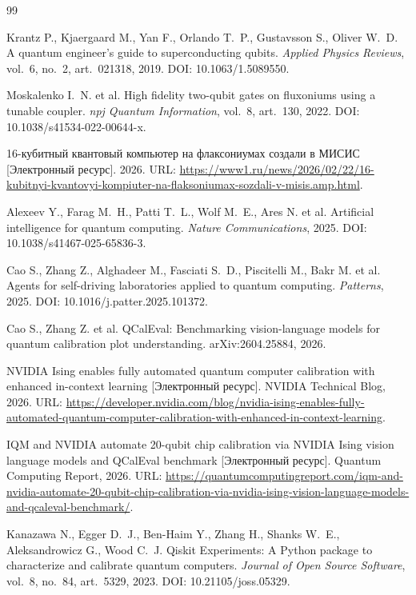 \documentclass{misisarticle}
\begin{document}
\begin{thebibliography}{99}

 Krantz P., Kjaergaard M., Yan F., Orlando T.~P., Gustavsson S., Oliver W.~D. A quantum engineer's guide to superconducting qubits. \textit{Applied Physics Reviews}, vol.~6, no.~2, art.~021318, 2019. DOI: 10.1063/1.5089550.

 Moskalenko I.~N. et al. High fidelity two-qubit gates on fluxoniums using a tunable coupler. \textit{npj Quantum Information}, vol.~8, art.~130, 2022. DOI: 10.1038/s41534-022-00644-x.

 16-кубитный квантовый компьютер на флаксониумах создали в МИСИС [Электронный ресурс]. 2026. URL: \url{https://www1.ru/news/2026/02/22/16-kubitnyi-kvantovyi-kompiuter-na-flaksoniumax-sozdali-v-misis.amp.html}.

 Alexeev Y., Farag M.~H., Patti T.~L., Wolf M.~E., Ares N. et al. Artificial intelligence for quantum computing. \textit{Nature Communications}, 2025. DOI: 10.1038/s41467-025-65836-3.

 Cao S., Zhang Z., Alghadeer M., Fasciati S.~D., Piscitelli M., Bakr M. et al. Agents for self-driving laboratories applied to quantum computing. \textit{Patterns}, 2025. DOI: 10.1016/j.patter.2025.101372.

 Cao S., Zhang Z. et al. QCalEval: Benchmarking vision-language models for quantum calibration plot understanding. arXiv:2604.25884, 2026.

 NVIDIA Ising enables fully automated quantum computer calibration with enhanced in-context learning [Электронный ресурс]. NVIDIA Technical Blog, 2026. URL: \url{https://developer.nvidia.com/blog/nvidia-ising-enables-fully-automated-quantum-computer-calibration-with-enhanced-in-context-learning}.

 IQM and NVIDIA automate 20-qubit chip calibration via NVIDIA Ising vision language models and QCalEval benchmark [Электронный ресурс]. Quantum Computing Report, 2026. URL: \url{https://quantumcomputingreport.com/iqm-and-nvidia-automate-20-qubit-chip-calibration-via-nvidia-ising-vision-language-models-and-qcaleval-benchmark/}.

 Kanazawa N., Egger D.~J., Ben-Haim Y., Zhang H., Shanks W.~E., Aleksandrowicz G., Wood C.~J. Qiskit Experiments: A Python package to characterize and calibrate quantum computers. \textit{Journal of Open Source Software}, vol.~8, no.~84, art.~5329, 2023. DOI: 10.21105/joss.05329.


\end{thebibliography}
\end{document}

